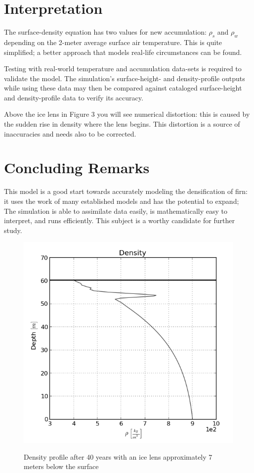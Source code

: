 \section{Interpretation}

The surface-density equation has two values for new accumulation: $\rho_s$ and $\rho_w$ depending on the 2-meter average surface air temperature.  This is quite simplified; a better approach that models real-life circumstances can be found.  

Testing with real-world temperature and accumulation data-sets is required to validate the model.  The simulation's surface-height- and density-profile outputs while using these data may then be compared against cataloged surface-height and density-profile data to verify its accuracy.

Above the ice lens in Figure 3 you will see numerical distortion: this is caused by the sudden rise in density where the lens begins.  This distortion is a source of inaccuracies and needs also to be corrected.


\section{Concluding Remarks}
This model is a good start towards accurately modeling the densification of firn: it uses the work of many established models and has the potential to expand;  The simulation is able to assimilate data easily, is mathematically easy to interpret, and runs efficiently.  This subject is a worthy candidate for further study.  

\begin{figure}
	\centering
		\includegraphics[width=\linewidth]{images/firn/40yrDen.png}
	\label{fig:500 year orbit}
	\caption{Density profile after 40 years with an ice lens approximately 7 meters below the surface}
\end{figure}

